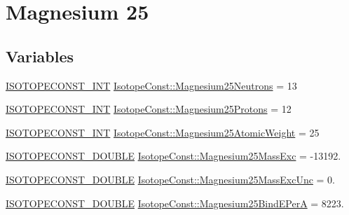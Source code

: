 \hypertarget{group___isotope_const-_magnesium-_mg25}{}\section{Magnesium 25}
\label{group___isotope_const-_magnesium-_mg25}
\subsection*{Variables}
\begin{DoxyCompactItemize}
\item 
\mbox{\hyperlink{group___isotope_const-_macros_ga5f18360b3e99483a35c32d789e62621c}{I\+S\+O\+T\+O\+P\+E\+C\+O\+N\+S\+T\+\_\+\+I\+NT}} \mbox{\hyperlink{group___isotope_const-_magnesium-_mg25_gae8bea2f28a317ec80c54e76130a35c78}{Isotope\+Const\+::\+Magnesium25\+Neutrons}} = 13
\item 
\mbox{\hyperlink{group___isotope_const-_macros_ga5f18360b3e99483a35c32d789e62621c}{I\+S\+O\+T\+O\+P\+E\+C\+O\+N\+S\+T\+\_\+\+I\+NT}} \mbox{\hyperlink{group___isotope_const-_magnesium-_mg25_gab54717d36d41671fed53a47846a74ac8}{Isotope\+Const\+::\+Magnesium25\+Protons}} = 12
\item 
\mbox{\hyperlink{group___isotope_const-_macros_ga5f18360b3e99483a35c32d789e62621c}{I\+S\+O\+T\+O\+P\+E\+C\+O\+N\+S\+T\+\_\+\+I\+NT}} \mbox{\hyperlink{group___isotope_const-_magnesium-_mg25_ga3ecddbdb03e31bd58936c04f9add470d}{Isotope\+Const\+::\+Magnesium25\+Atomic\+Weight}} = 25
\item 
\mbox{\hyperlink{group___isotope_const-_macros_ga8f45a7272ce02c0b4c65c44636ed719a}{I\+S\+O\+T\+O\+P\+E\+C\+O\+N\+S\+T\+\_\+\+D\+O\+U\+B\+LE}} \mbox{\hyperlink{group___isotope_const-_magnesium-_mg25_ga8ac92f1d6e5223beff08888c7dd73e74}{Isotope\+Const\+::\+Magnesium25\+Mass\+Exc}} = -\/13192.
\item 
\mbox{\hyperlink{group___isotope_const-_macros_ga8f45a7272ce02c0b4c65c44636ed719a}{I\+S\+O\+T\+O\+P\+E\+C\+O\+N\+S\+T\+\_\+\+D\+O\+U\+B\+LE}} \mbox{\hyperlink{group___isotope_const-_magnesium-_mg25_ga63c74173b6e2cfdaa519d101df88bdb7}{Isotope\+Const\+::\+Magnesium25\+Mass\+Exc\+Unc}} = 0.
\item 
\mbox{\hyperlink{group___isotope_const-_macros_ga8f45a7272ce02c0b4c65c44636ed719a}{I\+S\+O\+T\+O\+P\+E\+C\+O\+N\+S\+T\+\_\+\+D\+O\+U\+B\+LE}} \mbox{\hyperlink{group___isotope_const-_magnesium-_mg25_ga2b503422f899eec88877f54585d2af8c}{Isotope\+Const\+::\+Magnesium25\+Bind\+E\+PerA}} = 8223.
\item 

\end{DoxyCompactItemize}
